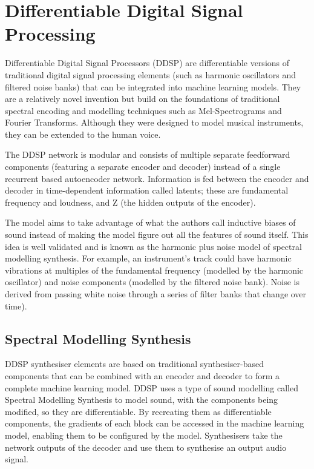 \section{Differentiable Digital Signal Processing}
\label{section:DDSP}

Differentiable Digital Signal Processors (DDSP) are differentiable versions of traditional digital signal processing elements (such as harmonic oscillators and filtered noise banks) that can be integrated into machine learning models\cite{OriginalDDSP}. They are a relatively novel invention but build on the foundations of traditional spectral encoding and modelling techniques such as Mel-Spectrograms and Fourier Transforms. Although they were designed to model musical instruments, they can be extended to the human voice.

The DDSP network is modular and consists of multiple separate feedforward components (featuring a separate encoder and decoder) instead of a single recurrent based autoencoder network. Information is fed between the encoder and decoder in time-dependent information called latents; these are fundamental frequency and loudness, and Z (the hidden outputs of the encoder).

The model aims to take advantage of what the authors call inductive biases of sound instead of making the model figure out all the features of sound itself. This idea is well validated and is known as the harmonic plus noise model of spectral modelling synthesis\cite{HarmonicPlusNoise}. For example, an instrument's track could have harmonic vibrations at multiples of the fundamental frequency (modelled by the harmonic oscillator) and noise components (modelled by the filtered noise bank). Noise is derived from passing white noise through a series of filter banks that change over time).

\subsection{Spectral Modelling Synthesis}

DDSP synthesiser elements are based on traditional synthesiser-based components that can be combined with an encoder and decoder to form a complete machine learning model. DDSP uses a type of sound modelling called Spectral Modelling Synthesis\cite{SpectralModellingSynthesis} to model sound, with the components being modified, so they are differentiable. By recreating them as differentiable components, the gradients of each block can be accessed in the machine learning model, enabling them to be configured by the model. Synthesisers take the network outputs of the decoder and use them to synthesise an output audio signal.


